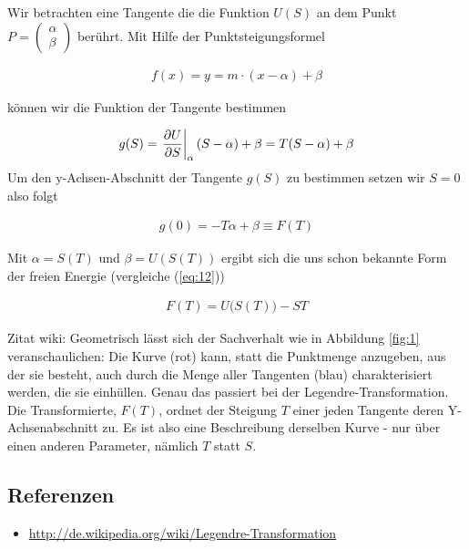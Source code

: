 Wir betrachten eine Tangente die die Funktion \(U(S)\) an dem Punkt \(P=\begin{pmatrix}
  \alpha\\\beta\end{pmatrix}\) berührt. Mit Hilfe der Punktsteigungsformel

\begin{align}
  \label{eq:14}
  f(x) = y = m\cdot(x-\alpha) + \beta
\end{align}

können wir die Funktion der Tangente bestimmen

\begin{align}
  \label{eq:15}
  g(S) = \left. \pdiff U_S\right|_\alpha ( S - \alpha) + \beta = T(S - \alpha) +\beta  
\end{align}
Um den y-Achsen-Abschnitt der Tangente \(g(S)\) zu bestimmen setzen wir \(S=0\) also folgt

\begin{align}
  \label{eq:16}
  g(0) = -T\alpha + \beta \equiv F(T)
\end{align}

Mit \(\alpha = S(T) \) und \(\beta = U(S(T))\) ergibt sich die uns schon bekannte Form der freien Energie (vergleiche (\ref{eq:12}))

\begin{align}
  \label{eq:17}
  F(T) = U\Big(S(T)\Big) - ST
\end{align}

Zitat wiki: Geometrisch lässt sich der Sachverhalt wie in Abbildung \ref{fig:1} veranschaulichen: Die Kurve (rot) kann, statt die Punktmenge anzugeben, aus der sie besteht, auch durch die Menge aller Tangenten (blau) charakterisiert werden, die sie einhüllen. Genau das passiert bei der Legendre-Transformation. Die Transformierte, \(F(T)\), ordnet der Steigung \(T\) einer jeden Tangente deren Y-Achsenabschnitt zu. Es ist also eine Beschreibung derselben Kurve - nur über einen anderen Parameter, nämlich \(T\) statt \(S\).


\subsection*{Referenzen}
\begin{itemize}
\item \url{http://de.wikipedia.org/wiki/Legendre-Transformation}
\end{itemize}


